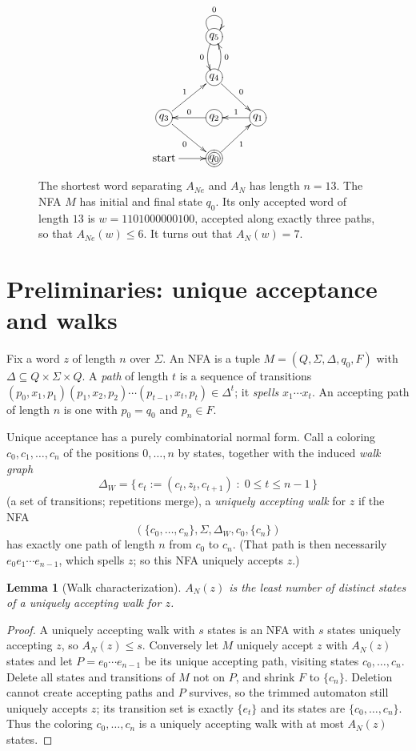 \documentclass[11pt]{article}
\newcommand{\word}{1101000000100}
\newtheorem{lemma}[theorem]{Lemma}
\theoremstyle{definition}
\newcommand{\AN}{A_N}
\newcommand{\ANe}{A_{Ne}}
\begin{document}
\begin{figure}
\[
	\xymatrix{
	&			  *+[Fo]{q_5}\ar@/_/[d]_0\ar@(ul,ur)^0\\
	&			  *+[Fo]{q_4}\ar[dr]^0\ar@/_/[u]_0\\
	*+[Fo]{q_3} \ar[dr]_0\ar[ur]^1 & *+[Fo]{q_2}\ar[l]_0 & *+[Fo]{q_1}\ar[l]_1\\
	 \text{start}\ar[r]& *+[Foo]{q_0}\ar[ur]_1 & \\
	}
\]
\caption{The shortest word separating $\ANe$ and $\AN$ has length $n=13$. The NFA $M$ has initial and final state $q_0$. Its only accepted
word of length $13$ is $w=\word$, accepted along exactly three paths, so
that $\ANe(w)\le 6$. It turns out that $\AN(w)=7$.
}
\label{fig:M}
\end{figure}


\section{Preliminaries: unique acceptance and walks}\label{sec:prelim}

Fix a word $z$ of length $n$ over $\Sigma$. An NFA is a tuple
$M=(Q,\Sigma,\Delta,q_0,F)$ with $\Delta\subseteq Q\times\Sigma\times Q$. A
\emph{path} of length $t$ is a sequence of transitions
$(p_0,x_1,p_1)(p_1,x_2,p_2)\cdots(p_{t-1},x_t,p_t)\in\Delta^t$; it
\emph{spells} $x_1\cdots x_t$. An accepting path of length $n$ is one with
$p_0=q_0$ and $p_n\in F$.

Unique acceptance has a purely combinatorial normal form. Call a coloring
$c_0,c_1,\dots,c_n$ of the positions $0,\dots,n$ by states, together with the
induced \emph{walk graph}
\[
\Delta_W=\{\,e_t:=(c_t,z_t,c_{t+1})\;:\;0\le t\le n-1\,\}
\]
(a set of transitions; repetitions merge), a \emph{uniquely accepting walk}
for $z$ if the NFA
\[
	(\{c_0,\dots,c_n\},\Sigma,\Delta_W,c_0,\{c_n\})
\]
has
exactly one path of length $n$ from $c_0$ to $c_n$. (That path is then
necessarily $e_0e_1\cdots e_{n-1}$, which spells $z$; so this NFA uniquely
accepts $z$.)

\begin{lemma}[Walk characterization]\label{lem:walk}
$\AN(z)$ is the least number of distinct states of a uniquely accepting walk
for $z$.
\end{lemma}

\begin{proof}
A uniquely accepting walk with $s$ states is an NFA with $s$ states uniquely
accepting $z$, so $\AN(z)\le s$. Conversely let $M$ uniquely accept $z$ with
$\AN(z)$ states and let $P=e_0\cdots e_{n-1}$ be its unique accepting path,
visiting states $c_0,\dots,c_n$. Delete all states and transitions of $M$ not
on $P$, and shrink $F$ to $\{c_n\}$. Deletion cannot create accepting paths
and $P$ survives, so the trimmed automaton still uniquely accepts $z$; its
transition set is exactly $\{e_t\}$ and its states are $\{c_0,\dots,c_n\}$.
Thus the coloring $c_0,\dots,c_n$ is a uniquely accepting walk with at most
$\AN(z)$ states.
\end{proof}
\end{document}
